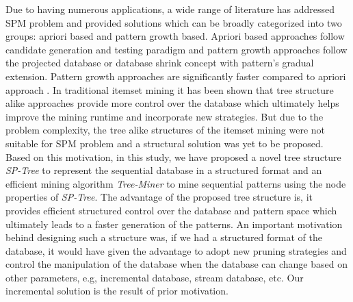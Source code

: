 Due to having numerous applications, a wide range of literature has addressed SPM problem and provided solutions which can be broadly categorized into two groups: apriori based and pattern growth based. Apriori based approaches follow candidate generation and testing paradigm and pattern growth approaches follow the projected database or database shrink concept with pattern's gradual extension. Pattern growth approaches are significantly faster compared to apriori approach \cite{borgelt2005implementation}. In traditional itemset mining it has been shown that tree structure alike approaches provide more control over the database which ultimately helps improve the mining runtime\cite{leung2007cantree,borgelt2005implementation} and incorporate new strategies. But due to the problem complexity, the tree alike structures of the itemset mining were not suitable for SPM problem and a structural solution was yet to be proposed. Based on this motivation, in this study, we have proposed a novel tree structure \textit{SP-Tree} to represent the sequential database in a structured format and an efficient mining algorithm \textit{Tree-Miner} to mine sequential patterns using the node properties of \textit{SP-Tree}. The advantage of the proposed tree structure is, it provides efficient structured control over the database and pattern space which ultimately leads to a faster generation of the patterns. An important motivation behind designing such a structure was, if we had a structured format of the database, it would have given the advantage to adopt new pruning strategies and control the manipulation of the database when the database can change based on other parameters, e.g, incremental database, stream database, etc. Our incremental solution is the result of prior motivation.



